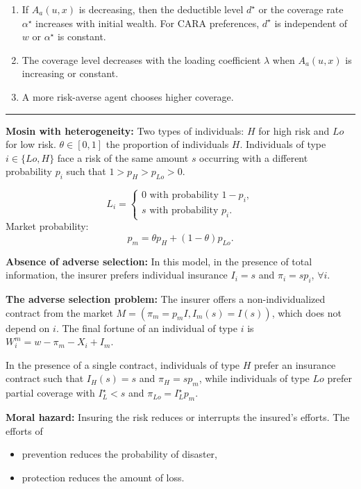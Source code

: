 \begin{f}
\begin{enumerate}
	\item If \(A_a(u, x)\) is decreasing, then the deductible level \(d^\star\) or the coverage rate \(\alpha^\star\) increases with initial wealth.
	For CARA preferences, \(d^\star\) is independent of \(w\) or \(\alpha^\star\) is constant.
	
	\item The coverage level decreases with the loading coefficient \(\lambda\) when \(A_a(u, x)\) is increasing or constant.
	
	\item A more risk-averse agent chooses higher coverage.
\end{enumerate}
\end{f}

\hrule

\begin{f}
	
	\textbf{Mosin with heterogeneity:} Two types of individuals: \(H\) for high risk and \(Lo\) for low risk. \(\theta \in[0,1]\) the proportion of individuals \(H\). Individuals of type \(i \in\{Lo, H\}\) face a risk of the same amount \(s\) occurring with a different probability \(p_{i}\) such that \(1>p_{H}>p_{Lo}>0\).
	
	\[
	L_{i}=\left\{\begin{array}{l}
		0 \text { with probability } 1-p_{i}, \\
		s \text { with probability } p_{i} .
	\end{array}\right.
	\]
Market probability:
	\[
	p_{m}=\theta p_{H}+(1-\theta) p_{Lo} .
	\]

\textbf{Absence of adverse selection:} In this model, in the presence of total information, the insurer prefers individual insurance \(I_{i}=s\) and \(\pi_{i}=s p_{i}\), \(\forall i\).

\textbf{The adverse selection problem: }
The insurer offers a non-individualized contract from the market \(M=\left(\pi_{m}=p_{m} I, I_{m}(s)=I(s)\right)\), which does not depend on \(i\). The final fortune of an individual of type \(i\) is \(W_{i}^{m}=w-\pi_{m}-X_{i}+I_{m}\).

In the presence of a single contract, individuals of type \(H\) prefer an insurance contract such that \(I_{H}(s)=s\) and \(\pi_{H}=s p_{m}\), while individuals of type \(Lo\) prefer partial coverage with \(I_{L}^{\star}<s\) and \(\pi_{Lo}=I_{L}^{\star} p_{m}\).
\medskip

\textbf{Moral hazard:}
Insuring the risk reduces or interrupts the insured's efforts. The efforts of
\begin{itemize}
	\item prevention reduces the probability of disaster,
	\item protection reduces the amount of loss.
\end{itemize}


\end{f}
